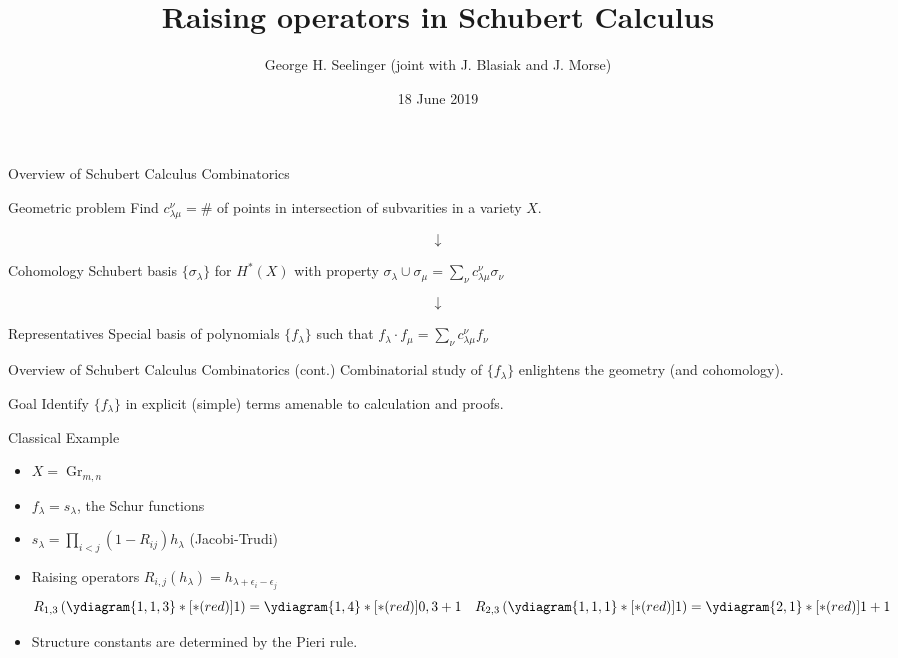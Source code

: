 \documentclass{beamer}
\title[Raising operators in Schubert Calculus]{Raising operators in Schubert Calculus} %
\author[George H. Seelinger]{George H. Seelinger (joint with
  J. Blasiak and J. Morse)} %
\institute[UVA] %
{
GarsiaFest 2019 \\ %
\medskip
\textit{ghs9ae@virginia.edu} %
}
\date{18 June 2019} %
\DeclareMathOperator{\Gr}{Gr}
\newcommand{\cupprod}{\cup}
\begin{document}
\begin{frame}
\titlepage %
\end{frame}
\begin{frame}{Overview of Schubert Calculus Combinatorics}
  \begin{block}{Geometric problem}
    Find \(c_{\lambda \mu}^\nu = \#\) of points in
    intersection of subvarities in a variety \(X\). \pause
  \end{block}
  \[
    \downarrow
  \]
  \begin{block}{Cohomology}
    Schubert basis \(\{\sigma_\lambda\}\) for \(H^*(X)\) with property \(\sigma_\lambda \cupprod \sigma_\mu = \sum_\nu c_{\lambda \mu}^\nu \sigma_\nu\) \pause 
\end{block}
\[
  \downarrow
\]
\begin{block}{Representatives}
  Special basis of polynomials \(\{f_\lambda\}\) such that \(f_\lambda \cdot f_\mu = \sum_\nu c_{\lambda \mu}^\nu f_\nu\)
\end{block}
\end{frame}
\begin{frame}{Overview of Schubert Calculus Combinatorics (cont.)}
  Combinatorial study of \(\{f_\lambda\}\) enlightens the geometry
  (and cohomology). \pause
  \begin{alertblock}{Goal}
    Identify \(\{f_\lambda\}\) in explicit (simple) terms amenable to
    calculation and proofs.
  \end{alertblock}
\end{frame}
\begin{frame}{Classical Example}
  \begin{example}
    \begin{itemize}
    \item \(X = \Gr_{m,n}\) \pause
    \item \(f_\lambda = s_\lambda\), the Schur functions \pause
    \item \(s_\lambda = \prod_{i < j} (1-R_{ij})h_\lambda\)
      (Jacobi-Trudi) \pause
      \item Raising operators
    \(R_{i,j}(h_\lambda) = h_{\lambda+\epsilon_i-\epsilon_j}\)
    \[
      R_{1,3} \left( \ydiagram{1,1,3}*[*(red)]{1} \right) =
      \ydiagram{1,4}*[*(red)]{0,3+1} \ \ \ R_{2,3} \left(
        \ydiagram{1,1,1}*[*(red)]{1} \right) =
      \ydiagram{2,1}*[*(red)]{1+1}
    \] \pause
    \item Structure constants are determined by the Pieri rule. 
    \end{itemize}
  \end{example}
\end{frame}
\end{document}
